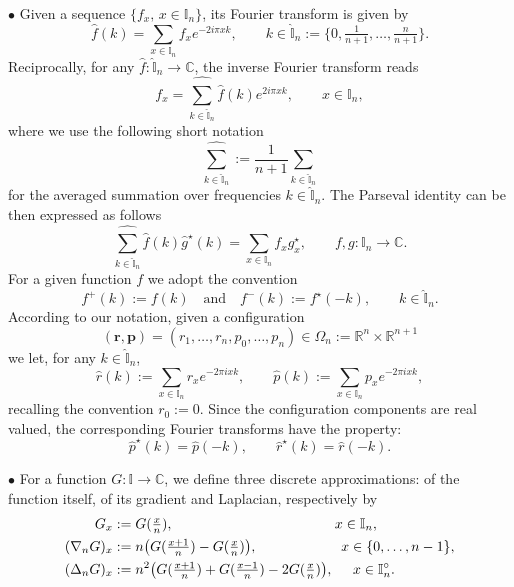 \documentclass[EJP]{ejpecp} %
\newcommand\R{{\mathbb R}}
\newcommand\T{{\mathbb I}}
\renewcommand{\hat}{\widehat}
\numberwithin{equation}{section}
\begin{document}
 $\bullet$ Given a sequence $\{f_x,\,x \in \T_n\}$, its Fourier transform is given by
\begin{equation}
  \label{eq:F3}
  \widehat f(k) = \sum_{x\in \T_n} f_x e^{-2i\pi x k} ,\qquad k\in \widehat\T_n := \big\{0, \tfrac 1{n+1}, \dots, \tfrac {n}{n+1}\big\}.
\end{equation}
Reciprocally, for any $\hat f: \hat\T_n \to \mathbb{C}$, the inverse Fourier transform reads 
\begin{equation}
  \label{eq:F4}
  f_x = \underset{{k\in \widehat{\T}_n}}{{\hat\sum}}\hat f(k)  e^{2i\pi x k},\qquad  x\in\T_n,
\end{equation}
where we use the following short notation 
\begin{equation}
\label{012001-20}
\underset{{k\in \widehat{\T}_n}}{{\hat\sum}}:=\frac 1{n+1} \sum_{k\in \widehat\T_n}
\end{equation}
for the averaged summation over frequencies $k\in\hat \T_n$. 
The Parseval identity can be then expressed  as follows
\begin{equation}
\label{parseval}
 \underset{{k\in \widehat{\T}_n}}{{\hat\sum}} \widehat f(k) \widehat g^\star(k) =
 \sum_{x\in \T_n}f_xg_x^\star ,\qquad f,g:\T_n\to\mathbb{C}.
\end{equation}
For a given function $f$ we adopt the convention
\begin{equation}
\label{iota}
f^+(k):=f(k)\quad\mbox{and}\quad f^-(k):=f^\star(-k),\qquad
k\in\hat\T_n.
\end{equation}
According to our notation, given a configuration 
\begin{equation*}
  (\mathbf r, \mathbf p) = (r_1, \dots, r_n, p_0, \dots, p_n) \in \Omega_n:=\R^{n}\times\R^{n+1}
\end{equation*}
we let, for any $k \in\hat\T_n$,
$$
\widehat r(k):=\sum_{x\in \T_n}r_x e^{-2\pi i x k},\qquad \widehat p(k):=\sum_{x\in \T_n}p_x e^{-2\pi i x k},
$$
recalling the convention $r_0:=0$.
Since the configuration components are real valued, the corresponding Fourier transforms have the property:
\begin{equation}
  \label{eq:w1}
  {\widehat p}^{\star}(k) =  {\widehat p}(-k), \qquad  {\widehat r}^{\star}(k) =  {\widehat r}(-k).
\end{equation}


 $\bullet$ For a  function  $G: \T \to \mathbb{C}$, we define three discrete  approximations: of the function itself, of its gradient and Laplacian, respectively by
 \begin{align}
\label{disc-approx}
G_x&:=G(\tfrac x n), \qquad \; \; \quad \qquad \qquad \qquad \qquad x\in\T_n,\notag\\
(\nabla_nG)_x&:=n\big(G(\tfrac{x+1}n)-G(\tfrac x n)\big), \qquad\qquad\qquad x\in\{0,\ldots,n-1\},\\
 (\Delta_nG)_x &:=n^2\big(G(\tfrac{x+1}n)+G(\tfrac{x-1}n)-2G(\tfrac x
   n)\big),\; \; \;\;\; x\in\T_n^{\circ}.\notag
\end{align}
\end{document}
